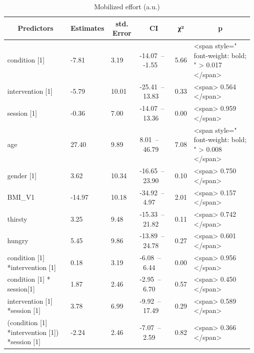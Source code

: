 \documentclass[
]{article}
\begin{document}
\begin{table}[H]

\caption{\label{tab:PIT_mod}Mobilized effort (a.u.)}
\centering
\begin{tabular}[t]{l|l|l|l|l|l}
\hline
\multicolumn{1}{c}{\textbf{Predictors}} & \multicolumn{1}{c}{\textbf{Estimates}} & \multicolumn{1}{c}{\textbf{std. Error}} & \multicolumn{1}{c}{\textbf{CI}} & \multicolumn{1}{c}{\textbf{χ²}} & \multicolumn{1}{c}{\textbf{p}}\\
\hline
condition [1] & -7.81 & 3.19 & -14.07 – -1.55 & 5.66 & <span style=" font-weight: bold; " > 0.017 </span>\\
\hline
intervention [1] & -5.79 & 10.01 & -25.41 – 13.83 & 0.33 & <span> 0.564 </span>\\
\hline
session [1] & -0.36 & 7.00 & -14.07 – 13.36 & 0.00 & <span> 0.959 </span>\\
\hline
age & 27.40 & 9.89 & 8.01 – 46.79 & 7.08 & <span style=" font-weight: bold; " > 0.008 </span>\\
\hline
gender [1] & 3.62 & 10.34 & -16.65 – 23.90 & 0.10 & <span> 0.750 </span>\\
\hline
BMI_V1 & -14.97 & 10.18 & -34.92 – 4.97 & 2.01 & <span> 0.157 </span>\\
\hline
thirsty & 3.25 & 9.48 & -15.33 – 21.82 & 0.11 & <span> 0.742 </span>\\
\hline
hungry & 5.45 & 9.86 & -13.89 – 24.78 & 0.27 & <span> 0.601 </span>\\
\hline
condition [1] *intervention [1] & 0.18 & 3.19 & -6.08 – 6.44 & 0.00 & <span> 0.956 </span>\\
\hline
condition [1] * session[1] & 1.87 & 2.46 & -2.95 – 6.70 & 0.57 & <span> 0.450 </span>\\
\hline
intervention [1] *session [1] & 3.78 & 6.99 & -9.92 – 17.49 & 0.29 & <span> 0.589 </span>\\
\hline
(condition [1] *intervention [1]) *session [1] & -2.24 & 2.46 & -7.07 – 2.59 & 0.82 & <span> 0.366 </span>\\
\hline
\end{tabular}
\end{table}
\end{document}
